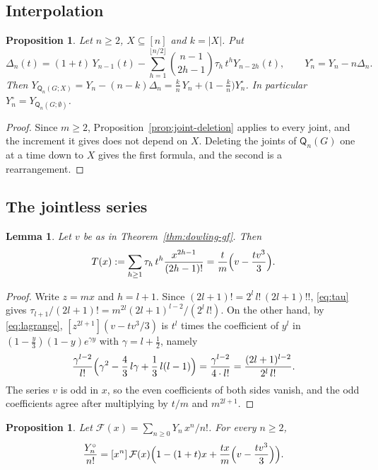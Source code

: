 \documentclass[11pt]{amsart}
\newtheorem{proposition}[theorem]{Proposition}
\newtheorem{lemma}[theorem]{Lemma}
\theoremstyle{definition}
\theoremstyle{remark}
\numberwithin{equation}{section}
\newcommand{\Q}{\mathsf{Q}}
\begin{document}
\subsection{Interpolation}

\begin{proposition}\label{prop:interpolation}
Let $n\ge2$, $X\subseteq[n]$ and $k=|X|$. Put
\[
\Delta_n(t)=(1+t)\,Y_{n-1}(t)-\sum_{h=1}^{\lfloor n/2\rfloor}\binom{n-1}{2h-1}\tau_h\,t^hY_{n-2h}(t),\qquad Y^\circ_n=Y_n-n\Delta_n.
\]
Then $Y_{\Q_n(G;X)}=Y_n-(n-k)\Delta_n=\frac kn\,Y_n+\bigl(1-\frac kn\bigr)Y^\circ_n$. In particular $Y^\circ_n=Y_{\Q_n(G;\emptyset)}$.
\end{proposition}

\begin{proof}
Since $m\ge2$, Proposition~\ref{prop:joint-deletion} applies to every joint, and the increment it gives does not depend on $X$. Deleting the joints of $\Q_n(G)$ one at a time down to $X$ gives the first formula, and the second is a rearrangement.
\end{proof}

\subsection{The jointless series}

\begin{lemma}\label{lem:tau-series}
Let $v$ be as in Theorem~\textup{\ref{thm:dowling-gf}}. Then
\[
T(x):=\sum_{h\ge1}\tau_h\,t^h\frac{x^{2h-1}}{(2h-1)!}=\frac tm\Bigl(v-\frac{tv^3}3\Bigr).
\]
\end{lemma}

\begin{proof}
Write $z=mx$ and $h=l+1$. Since $(2l+1)!=2^l\,l!\,(2l+1)!!$, \eqref{eq:tau} gives $\tau_{l+1}/(2l+1)!=m^{2l}(2l+1)^{l-2}/(2^l\,l!)$. On the other hand, by \eqref{eq:lagrange}, $[z^{2l+1}](v-tv^3/3)$ is $t^l$ times the coefficient of $y^l$ in $(1-\frac y3)(1-y)e^{\gamma y}$ with $\gamma=l+\frac12$, namely
\[
\frac{\gamma^{l-2}}{l!}\Bigl(\gamma^2-\frac43\,l\gamma+\frac13\,l(l-1)\Bigr)=\frac{\gamma^{l-2}}{4\cdot l!}=\frac{(2l+1)^{l-2}}{2^l\,l!}.
\]
The series $v$ is odd in $x$, so the even coefficients of both sides vanish, and the odd coefficients agree after multiplying by $t/m$ and $m^{2l+1}$.
\end{proof}

\begin{proposition}\label{prop:jointless-series}
Let $\mathcal{F}(x)=\sum_{n\ge0}Y_n\,x^n/n!$. For every $n\ge2$,
\[
\frac{Y^\circ_n}{n!}=[x^n]\,\mathcal{F}(x)\Bigl(1-(1+t)x+\frac{tx}{m}\Bigl(v-\frac{tv^3}{3}\Bigr)\Bigr).
\]
\end{proposition}
\end{document}
